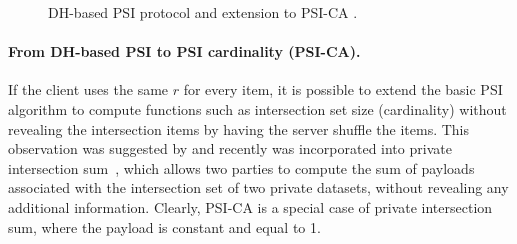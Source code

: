 \begin{figure}[h]
	\centering
	\caption{DH-based PSI protocol and  extension to PSI-CA .}
	\label{fig:dh-psi}
\end{figure}



\paragraph{From DH-based PSI to PSI cardinality (PSI-CA).}

If the client uses the same $r$ for every item, it is possible to extend the basic PSI algorithm to compute functions such as intersection set size (cardinality) without revealing the intersection items by having the server shuffle the items. This observation was suggested by \cite{Huberman99} and recently was incorporated into private intersection sum~\cite{EPRINT:IKNPRSSSY19}, which allows two parties to compute the sum of payloads associated with the intersection set of two private datasets, without revealing any additional information. Clearly, PSI-CA is a special case of private intersection sum, where the payload is constant and equal to 1. 

